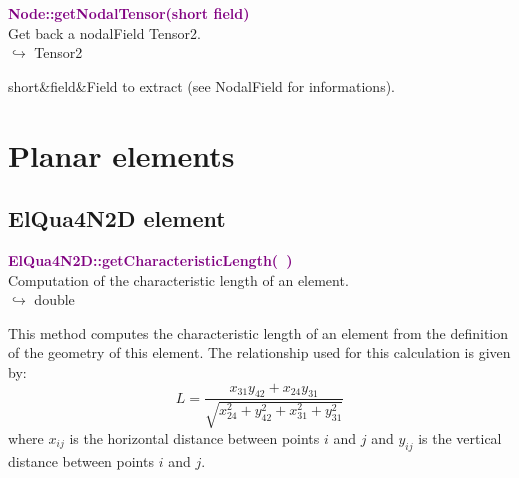
\textcolor{purple}{\textbf{Node::getNodalTensor(short field)}}\label{Node::getNodalTensor(short field)}\\
Get back a nodalField Tensor2.\\ \hspace*{10mm}$\hookrightarrow$ Tensor2

\begin{tcolorbox}[width=\textwidth,myArgs,tabularx={ll|R}]
short&field&Field to extract (see NodalField for informations).
\end{tcolorbox}


\section{Planar elements}

\subsection{ElQua4N2D element}

\textcolor{purple}{\textbf{ElQua4N2D::getCharacteristicLength(~)}}\label{ElQua4N2D::getCharacteristicLength()}\\
Computation of the characteristic length of an element.\\ \hspace*{10mm}$\hookrightarrow$ double

This method computes the characteristic length of an element from the definition of the geometry of this element.
The relationship used for this calculation is given by:
\begin{equation}
L=\frac{x_{31} y_{42}+x_{24} y_{31}}{\sqrt{x_{24}^2+y_{42}^2+x_{31}^2+y_{31}^2}}
\end{equation}
where $x_{ij}$ is the horizontal distance between points $i$ and $j$ and $y_{ij}$ is the vertical distance between points $i$ and $j$.

